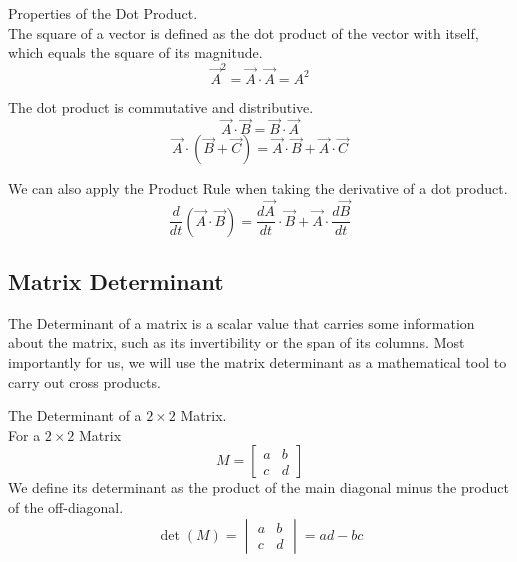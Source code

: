 \documentclass[11pt]{article}
\theoremstyle{gangnamstyle}{\newtheorem{definition}{Definition}[]}
\theoremstyle{gangnamstyle}{\newtheorem{example}{Example}[]}
\theoremstyle{gangnamstyle}{\newtheorem{problem}{Problem}[]}
\begin{document}
\begin{definition}
Properties of the Dot Product. \\
The square of a vector is defined as the dot product of the vector with itself, which equals the square of its magnitude.
\begin{equation}
\Vec{A}^2 = \Vec{A} \cdot \Vec{A} = A^2
\end{equation}

The dot product is commutative and distributive. 
\begin{equation}
\Vec{A} \cdot \Vec{B} = \Vec{B} \cdot \Vec{A}
\end{equation}
\begin{equation}
\Vec{A} \cdot (\Vec{B} + \Vec{C}) = \Vec{A} \cdot \Vec{B} + \Vec{A} \cdot \Vec{C}
\end{equation}

We can also apply the Product Rule when taking the derivative of a dot product. 
\begin{equation}
\frac{d}{dt}(\Vec{A} \cdot \Vec{B}) = \frac{d\Vec{A}}{dt} \cdot \Vec{B} + \Vec{A} \cdot \frac{d\Vec{B}}{dt}
\end{equation}
\end{definition}

\subsection{Matrix Determinant}

The Determinant of a matrix is a scalar value that carries some information about the matrix, such as its invertibility or the span of its columns. Most importantly for us, we will use the matrix determinant as a mathematical tool to carry out cross products. 

\begin{definition}
The Determinant of a $2 \times 2$ Matrix. \\
For a $2 \times 2$ Matrix
\begin{equation}
M = 
\begin{bmatrix}
a & b \\
c & d 
\end{bmatrix}
\end{equation}
We define its determinant as the product of the main diagonal minus the product of the off-diagonal. 
\begin{equation}
\det(M) = \begin{vmatrix}
a & b \\
c & d 
\end{vmatrix} = ad - bc
\end{equation}
\end{definition}
\end{document}

